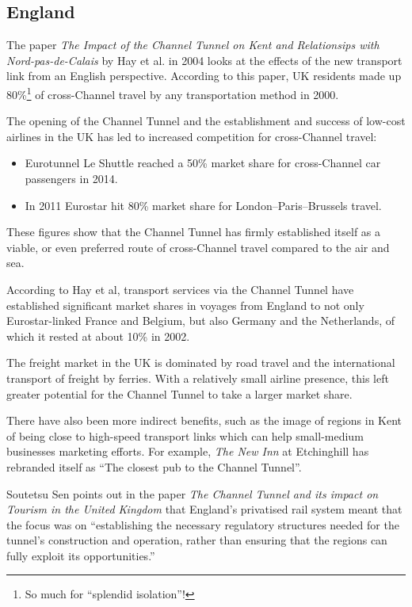 \documentclass[12pt]{article} %
\begin{document}
\subsection{England}
The paper \textit{The Impact of the Channel Tunnel on Kent and Relationsips with Nord-pas-de-Calais} by Hay et al. in 2004\cite{hay04} looks at the effects of the new transport link from an English perspective. According to this paper, UK residents made up 80\%\footnote{So much for ``splendid isolation''!} of cross-Channel travel by any transportation method in 2000.

The opening of the Channel Tunnel and the establishment and success of low-cost airlines in the UK has led to increased competition for cross-Channel travel:
\begin{itemize}
\item Eurotunnel Le Shuttle reached a 50\% market share for cross-Channel car passengers in 2014.
\item In 2011 Eurostar hit 80\% market share for London--Paris--Brussels travel.\cite{star11}
\end{itemize}

These figures show that the Channel Tunnel has firmly established itself as a viable, or even preferred route of cross-Channel travel compared to the air and sea.

According to Hay et al, transport services via the Channel Tunnel have established significant market shares in voyages from England to not only Eurostar-linked France and Belgium, but also Germany and the Netherlands, of which it rested at about 10\% in 2002.

The freight market in the UK is dominated by road travel and the international transport of freight by ferries. With a relatively small airline presence, this left greater potential for the Channel Tunnel to take a larger market share.

There have also been more indirect benefits, such as the image of regions in Kent of being close to high-speed transport links which can help small-medium businesses marketing efforts. For example, \emph{The New Inn} at Etchinghill has rebranded itself as ``The closest pub to the Channel Tunnel''.

Soutetsu Sen points out in the paper \emph{The Channel Tunnel and its impact on Tourism in the United Kingdom}\cite{sen04} that England's privatised rail system meant that the focus was on ``establishing the necessary regulatory structures needed for the tunnel’s construction and operation, rather than ensuring that the regions can fully exploit its opportunities.''
\end{document}
